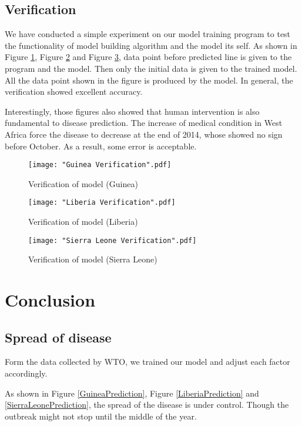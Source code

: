 \documentclass[11pt]{article}
\begin{document}
\subsection{Verification}

We have conducted a simple experiment on our model training program to test the functionality of model building algorithm and the model its self. As shown in Figure \ref{GuineaVerification}, Figure \ref{LiberiaVerification} and Figure \ref{SierraLeoneVerification}, data point before predicted line is given to the program and the model. Then only the initial data is given to the trained model. All the data point shown in the figure is produced by the model. In general, the verification showed excellent accuracy.

Interestingly, those figures also showed that human intervention is also fundamental to disease prediction. The increase of medical condition in West Africa force the disease to decrease at the end of 2014, whose showed no sign before October. As a result, some error is acceptable.

\begin{figure}[htbp]
\centerline{\texttt{[image: "Guinea Verification".pdf]}}
\caption{Verification of model (Guinea)}
\label{GuineaVerification}
\end{figure}

\begin{figure}[htbp]
\centerline{\texttt{[image: "Liberia Verification".pdf]}}
\caption{Verification of model (Liberia)}
\label{LiberiaVerification}
\end{figure}

\begin{figure}[htbp]
\centerline{\texttt{[image: "Sierra Leone Verification".pdf]}}
\caption{Verification of model (Sierra Leone)}
\label{SierraLeoneVerification}
\end{figure}


\section{Conclusion}

\subsection{Spread of disease}

Form the data collected by WTO, we trained our model and adjust each factor accordingly.

As shown in Figure \ref{GuineaPrediction}, Figure \ref{LiberiaPrediction} and \ref{SierraLeonePrediction}, the spread of the disease is under control. Though the outbreak might not stop until the middle of the year.
\end{document}
